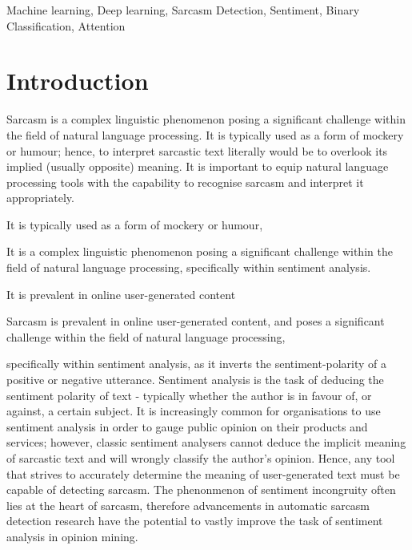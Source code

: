 \documentclass[12pt,a4paper]{article}
\begin{document}
\begin{keywords}
Machine learning, Deep learning, Sarcasm Detection, Sentiment, Binary Classification, Attention
\end{keywords}


\section{Introduction}
\noindent Sarcasm is a complex linguistic phenomenon posing a significant challenge within the field of natural language processing. It is typically used as a form of mockery or humour; hence, to interpret sarcastic text literally would be to overlook its implied (usually opposite) meaning. It is important to equip natural language processing tools with the capability to recognise sarcasm and interpret it appropriately.



It is typically used as a form of mockery or humour, 

 

It is a complex linguistic phenomenon posing a significant challenge within the field of natural language processing, specifically within sentiment analysis.

 It is prevalent in online user-generated content
 
 Sarcasm is prevalent in online user-generated content, and poses a significant challenge within the field of natural language processing, 
 
 
 specifically within sentiment analysis, as it inverts the sentiment-polarity of a positive or negative utterance. Sentiment analysis is the task of deducing the sentiment polarity of text - typically whether the author is in favour of, or against, a certain subject. It is increasingly common for organisations to use sentiment analysis in order to gauge public opinion on their products and services; however, classic sentiment analysers cannot deduce the implicit meaning of sarcastic text and will wrongly classify the author's opinion. Hence, any tool that strives to accurately determine the meaning of user-generated text must be capable of detecting sarcasm. The phenonmenon of sentiment incongruity often lies at the heart of sarcasm, therefore advancements in automatic sarcasm detection research have the potential to vastly improve the task of sentiment analysis in opinion mining.

\end{document}
